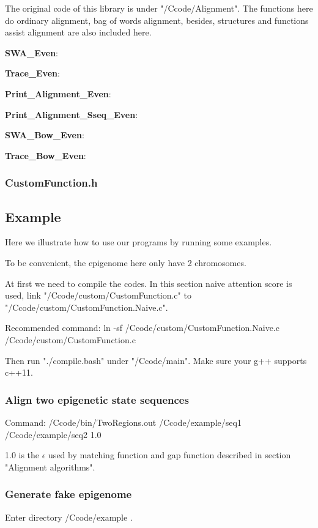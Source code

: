 \documentclass[a4paper]{article}
\begin{document}
\begin{CJK*}{UTF8}{kai}
The original code of this library is under "/Ccode/Alignment". The functions here do ordinary alignment, bag of words alignment, besides, structures and functions assist alignment are also included here.

\noindent
\textbf{SWA\_Even}:

\noindent
\textbf{Trace\_Even}:

\noindent
\textbf{Print\_Alignment\_Even}:

\noindent
\textbf{Print\_Alignment\_Sseq\_Even}:

\noindent
\textbf{SWA\_Bow\_Even}:

\noindent
\textbf{Trace\_Bow\_Even}:

\subsubsection{CustomFunction.h}

\subsection{Example}
Here we illustrate how to use our programs by running some examples.

To be convenient, the epigenome here only have 2 chromosomes.

At first we need to compile the codes. In this section naive attention score is used, link "/Ccode/custom/CustomFunction.c" to "/Ccode/custom/CustomFunction.Naive.c".

Recommended command: ln -sf /Ccode/custom/CustomFunction.Naive.c /Ccode/custom/CustomFunction.c

Then run "./compile.bash" under "/Ccode/main". Make sure your g++ supports c++11.

\subsubsection{Align two epigenetic state sequences}

Command: /Ccode/bin/TwoRegions.out /Ccode/example/seq1 /Ccode/example/seq2 1.0

1.0 is the $\epsilon$ used by matching function and gap function described in section "Alignment algorithms".

\subsubsection{Generate fake epigenome}
 
Enter directory /Ccode/example .


\end{CJK*}
\end{document}
